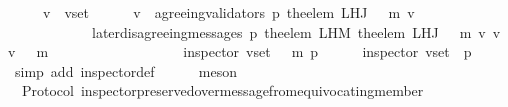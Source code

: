\begin{isabellebody}
\ \ \ \ \ {\isachardoublequoteopen}v{\isacharprime}\ {\isasymin}\ v{\isacharunderscore}set{\isacharprime}{\isachardoublequoteclose}\isanewline
\ \ \ \ \isamarkupfalse%
\ {\isachardoublequoteopen}v{\isacharprime}\ {\isasymin}\ agreeing{\isacharunderscore}validators\ {\isacharparenleft}p{\isacharcomma}\ the{\isacharunderscore}elem\ {\isacharparenleft}L{\isacharunderscore}H{\isacharunderscore}J\ {\isacharparenleft}{\isasymsigma}\ {\isasymunion}\ {\isacharbraceleft}m{\isacharbraceright}{\isacharparenright}\ v{\isacharparenright}{\isacharparenright}\ {\isasymand}\isanewline
\ \ \ \ \ \ \ \ \ \ \ \ later{\isacharunderscore}disagreeing{\isacharunderscore}messages\ {\isacharparenleft}p{\isacharcomma}\ the{\isacharunderscore}elem\ {\isacharparenleft}L{\isacharunderscore}H{\isacharunderscore}M\ {\isacharparenleft}the{\isacharunderscore}elem\ {\isacharparenleft}L{\isacharunderscore}H{\isacharunderscore}J\ {\isacharparenleft}{\isasymsigma}\ {\isasymunion}\ {\isacharbraceleft}m{\isacharbraceright}{\isacharparenright}\ v{\isacharparenright}{\isacharparenright}\ v{\isacharprime}{\isacharparenright}{\isacharcomma}\ v{\isacharprime}{\isacharcomma}\ {\isasymsigma}\ {\isasymunion}\ {\isacharbraceleft}m{\isacharbraceright}{\isacharparenright}\ {\isacharequal}\ {\isasymemptyset}{\isachardoublequoteclose}\isanewline
\ \ \ \ \ \ \isamarkupfalse%
\isanewline
\ \ \ \ \isamarkupfalse%
\isanewline
\ \ \isamarkupfalse%
\ \isamarkupfalse%
\ {\isachardoublequoteopen}inspector\ {\isacharparenleft}v{\isacharunderscore}set{\isacharcomma}\ {\isasymsigma}\ {\isasymunion}\ {\isacharbraceleft}m{\isacharbraceright}{\isacharcomma}\ p{\isacharparenright}{\isachardoublequoteclose}\isanewline
\ \ \ \ \isamarkupfalse%
\ {\isacartoucheopen}inspector\ {\isacharparenleft}v{\isacharunderscore}set{\isacharcomma}\ {\isasymsigma}{\isacharcomma}\ p{\isacharparenright}{\isacartoucheclose}\isanewline
\ \ \ \ \isamarkupfalse%
\ {\isacharparenleft}simp\ add{\isacharcolon}\ inspector{\isacharunderscore}def{\isacharparenright}\isanewline
\ \ \ \ \isamarkupfalse%
\ meson\isanewline
{}\isamarkupfalse%
%
\endisatagproof
{\isafoldproof}%
%
\isadelimproof
\isanewline
%
\endisadelimproof
\isanewline
\isanewline
\isanewline
\isanewline
\isanewline
\isanewline
\isanewline
{}\isamarkupfalse%
\ {\isacharparenleft}\ Protocol{\isacharparenright}\ inspector{\isacharunderscore}preserved{\isacharunderscore}over{\isacharunderscore}message{\isacharunderscore}from{\isacharunderscore}equivocating{\isacharunderscore}member\ {\isacharcolon}\isanewline

\end{isabellebody}

